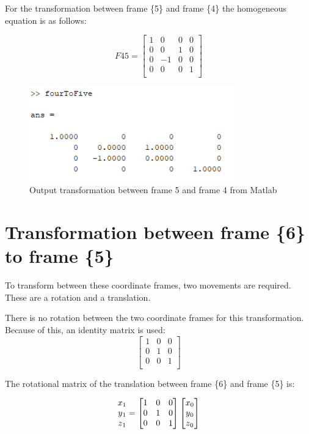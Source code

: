 \documentclass [11pt]{report}
\begin{document}
For the transformation between frame \{5\} and frame \{4\} the homogeneous equation is as follows: 

\begin{equation*}
F45
= 
\begin{bmatrix}
1&0&0&0\\
0&0&1&0\\
0&-1&0&0\\
0&0&0&1\\
\end{bmatrix}
\end{equation*}

\begin{figure}[H]
\centerline{\includegraphics[width=9cm]{fourToFiveoutput.png}}
\caption{Output transformation between frame 5 and frame 4 from Matlab}
\label{fig}
\end{figure}

\section{Transformation between frame \{6\}\, to frame \{5\}}

To transform between these coordinate frames, two movements are required. These are a rotation and a translation. 

There is no rotation between the two coordinate frames for this transformation. Because of this, an identity matrix is used: 
$$
\begin{bmatrix}
1&0&0\\
0&1&0\\
0&0&1\\
\end{bmatrix}
$$

The rotational matrix of the translation between frame \{6\} and frame \{5\} is:

\begin{equation*}
\begin{matrix}
x\textsubscript{1}\\
y\textsubscript{1}\\
z\textsubscript{1}\\
\end{matrix}
= 
\begin{bmatrix}
1&0&0\\
0&1&0\\
0&0&1\\
\end{bmatrix}
\begin{bmatrix}
x\textsubscript{0}\\
y\textsubscript{0}\\
z\textsubscript{0}\\
\end{bmatrix}
\end{equation*}
\end{document}
